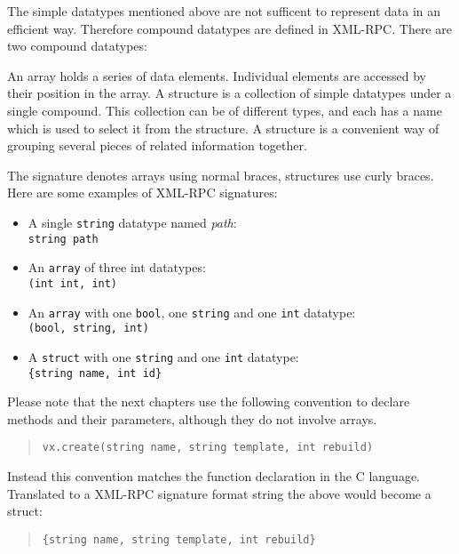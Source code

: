 The simple datatypes mentioned above are not sufficent to represent data in an
efficient way. Therefore compound datatypes are defined in XML-RPC. There are
two compound datatypes:

\begin{labeling}{}
 An array holds a series of data elements. Individual
	elements are accessed by their position in the array.
 A structure is a collection of simple datatypes under
	a single compound. This collection can be of different types, and each has
	a name which is used to select it from the structure. A structure is a
	convenient way of grouping several pieces of related information together.
\end{labeling}

The signature denotes arrays using normal braces, structures use curly braces.
Here are some examples of XML-RPC signatures:

\begin{itemize}
\item A single \verb,string, datatype named \emph{path}:\\
	\verb,string path,
\item An \verb,array, of three int datatypes:\\
	\verb|(int int, int)|
\item An \verb,array, with one \verb,bool,, one \verb,string, and one
	\verb,int, datatype:\\
	\verb|(bool, string, int)|
\item A \verb,struct, with one \verb,string, and one \verb,int,
	datatype:\\
	\verb|{string name, int id}|
\end{itemize}

Please note that the next chapters use the following convention to declare
methods and their parameters, although they do not involve arrays.

\begin{quote}
\verb|vx.create(string name, string template, int rebuild)|
\end{quote}

Instead this convention matches the function declaration in the C language.
Translated to a XML-RPC signature format string the above would become a struct:

\begin{quote}
\verb|{string name, string template, int rebuild}|
\end{quote}

